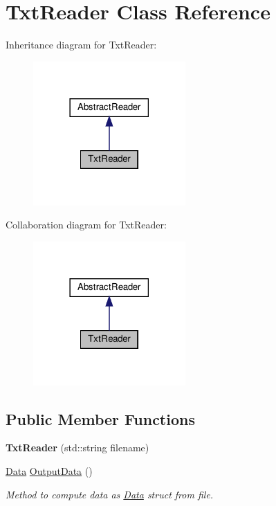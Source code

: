 \hypertarget{class_txt_reader}{}\section{Txt\+Reader Class Reference}
\label{class_txt_reader}


Inheritance diagram for Txt\+Reader\+:\nopagebreak
\begin{figure}[H]
\begin{center}
\leavevmode
\includegraphics[width=165pt]{class_txt_reader__inherit__graph}
\end{center}
\end{figure}


Collaboration diagram for Txt\+Reader\+:\nopagebreak
\begin{figure}[H]
\begin{center}
\leavevmode
\includegraphics[width=165pt]{class_txt_reader__coll__graph}
\end{center}
\end{figure}
\subsection*{Public Member Functions}
\begin{DoxyCompactItemize}
\item 
\mbox{\label{class_txt_reader_acbef0ef9c6034581d76a3b9e305f1508}} 
{\bfseries Txt\+Reader} (std\+::string filename)
\item 
\hyperlink{struct_data}{Data} \hyperlink{class_txt_reader_a30786dcd83c2f24dd26e83cb5fd934ab}{Output\+Data} ()
\begin{DoxyCompactList}\small\item\em Method to compute data as \hyperlink{struct_data}{Data} struct from file. \end{DoxyCompactList}\end{DoxyCompactItemize}
